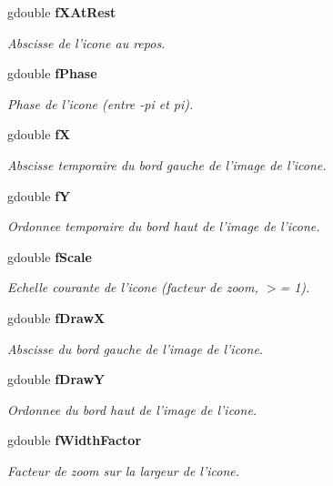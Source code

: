 \begin{CompactItemize}
gdouble {\bf fXAtRest}
\begin{CompactList}\small\item\em Abscisse de l'icone au repos. \item\end{CompactList}\item 
gdouble {\bf fPhase}
\begin{CompactList}\small\item\em Phase de l'icone (entre -pi et pi). \item\end{CompactList}\item 
gdouble {\bf fX}
\begin{CompactList}\small\item\em Abscisse temporaire du bord gauche de l'image de l'icone. \item\end{CompactList}\item 
gdouble {\bf fY}
\begin{CompactList}\small\item\em Ordonnee temporaire du bord haut de l'image de l'icone. \item\end{CompactList}\item 
gdouble {\bf fScale}
\begin{CompactList}\small\item\em Echelle courante de l'icone (facteur de zoom, $>$= 1). \item\end{CompactList}\item 
gdouble {\bf fDrawX}
\begin{CompactList}\small\item\em Abscisse du bord gauche de l'image de l'icone. \item\end{CompactList}\item 
gdouble {\bf fDrawY}
\begin{CompactList}\small\item\em Ordonnee du bord haut de l'image de l'icone. \item\end{CompactList}\item 
gdouble {\bf fWidthFactor}
\begin{CompactList}\small\item\em Facteur de zoom sur la largeur de l'icone. \item\end{CompactList}\item 

\end{CompactItemize}
